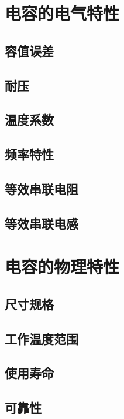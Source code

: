 \documentclass[12pt,UTF8]{ctexbook}
\begin{document}
\section{电容的电气特性}

\subsection{容值误差}

\subsection{耐压}

\subsection{温度系数}

\subsection{频率特性}

\subsection{等效串联电阻}

\subsection{等效串联电感}

\section{电容的物理特性}

\subsection{尺寸规格}

\subsection{工作温度范围}

\subsection{使用寿命}

\subsection{可靠性}
\end{document}

